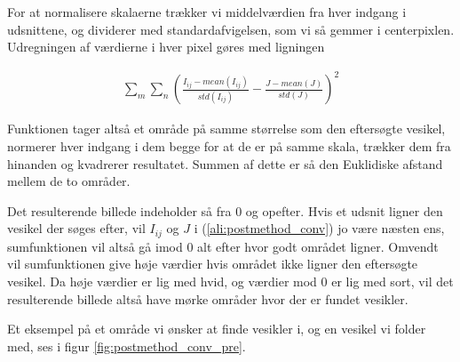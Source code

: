 For at normalisere skalaerne trækker vi middelværdien fra hver indgang i udsnittene, og dividerer med standardafvigelsen, som vi så gemmer i centerpixlen. Udregningen af værdierne i hver pixel gøres med ligningen

\begin{align}
	\sum_m\sum_n \left(\frac{I_{ij}-mean(I_{ij})}{std(I_{ij})}-\frac{J-mean(J)}{std(J)}\right)^2 \label{ali:postmethod_conv}
\end{align}

Funktionen tager altså et område på samme størrelse som den eftersøgte vesikel, normerer hver indgang i dem begge for at de er på samme skala, trækker dem fra hinanden og kvadrerer resultatet. Summen af dette er så den Euklidiske afstand mellem de to områder.

Det resulterende billede indeholder så fra 0 og opefter. Hvis et udsnit ligner den vesikel der søges efter, vil $I_{ij}$ og $J$ i (\ref{ali:postmethod_conv}) jo være næsten ens, sumfunktionen vil altså gå imod 0 alt efter hvor godt området ligner. Omvendt vil sumfunktionen give høje værdier hvis området ikke ligner den eftersøgte vesikel. Da høje værdier er lig med hvid, og værdier mod 0 er lig med sort, vil det resulterende billede altså have mørke områder hvor der er fundet vesikler. 

Et eksempel på et område vi ønsker at finde vesikler i, og en vesikel vi folder med, ses i figur \ref{fig:postmethod_conv_pre}.

